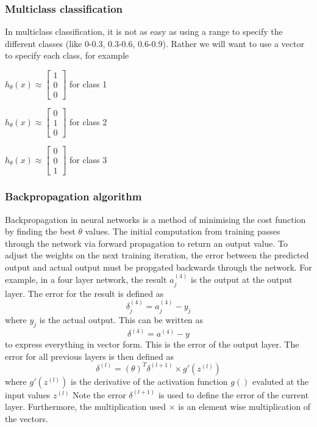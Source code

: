 \documentclass[CS5104-Notes.tex]{subfiles}
\begin{document}
\subsubsection{Multiclass classification}
In multiclass classification, it is not as easy as using a range to specify the different classes (like 0-0.3, 0.3-0.6, 0.6-0.9). Rather we will want to use a vector to specify each class, for example
\n
\begin{minipage}{0.31\textwidth}
  $h_{\theta}(x) \approx \begin{bmatrix} 1 \\ 0 \\ 0 \end{bmatrix}$ for class 1
\end{minipage}
\begin{minipage}{0.31\textwidth}
$h_{\theta}(x) \approx \begin{bmatrix} 0 \\ 1 \\ 0 \end{bmatrix}$ for class 2
\end{minipage}
\begin{minipage}{0.31\textwidth}
$h_{\theta}(x) \approx \begin{bmatrix} 0 \\ 0 \\ 1 \end{bmatrix}$ for class 3
\end{minipage}


\subsubsection{Backpropagation algorithm}
Backpropagation in neural networks is a method of minimising the cost function by finding the best $\theta$ values. The initial computation from training passes through the network via forward propagation to return an output value. To adjust the weights on the next training iteration, the error between the predicted output and actual output must be propgated backwards through the network.
\n
For example, in a four layer network, the result $a_{j}^{(4)}$ is the output at the output layer. The error for the result is defined as
\begin{equation}
\delta_{j}^{(4)} = a_{j}^{(4)} - y_{j}
\end{equation}
where $y_{j}$ is the actual output. This can be written as
\begin{equation}
\delta^{(4)} = a^{(4)} - y
\end{equation}
to express everything in vector form. This is the error of the output layer. The error for all previous layers is then defined as
\begin{equation}
\delta^{(l)} = (\theta)^{T}\delta^{(l+1)} \times g'(z^{(l)})
\end{equation}
where $g'(z^{(l)})$ is the derivative of the activation function $g()$ evaluted at the input values $z^{(l)}$ Note the error $\delta^{(l+1)}$ is used to define the error of the current layer. Furthermore, the multiplication used $\times$ is an element wise multiplication of the vectors.
\end{document}
